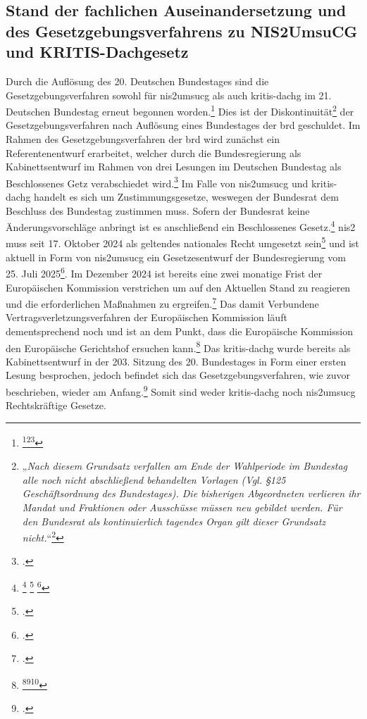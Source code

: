 \documentclass[11pt,a4paper,hidelinks]{article}   %
\begin{document}
        \subsection{Stand der fachlichen Auseinandersetzung und des Gesetzgebungsverfahrens zu NIS2UmsuCG und KRITIS-Dachgesetz}\label{subsec:AktuellerForschungsstand}
        Durch die Auflösung des 20. Deutschen Bundestages sind die Gesetzgebungsverfahren sowohl für \gls{nis2umsucg} als auch \gls{kritis-dachg} im 21. Deutschen Bundestag erneut begonnen worden.\footnote{\footcite[Vgl.][, Vgl.]{BTGO}\footcite[Vgl.][, S. 1]{brd:c54cf9}\footcite[Vgl.][, S. 52]{brd:4a7cbe}} Dies ist der Diskontinuität\footnote{„\emph{Nach diesem Grundsatz verfallen am Ende der Wahlperiode im Bundestag alle noch nicht abschließend behandelten Vorlagen (Vgl. §125 Geschäftsordnung des Bundestages). Die bisherigen Abgeordneten verlieren ihr Mandat und Fraktionen oder Ausschüsse müssen neu gebildet werden. Für den Bundesrat als kontinuierlich tagendes Organ gilt dieser Grundsatz nicht.}“\footcite[Vgl.][, S. 1]{brd:33503f}} der Gesetzgebungsverfahren nach Auflösung eines Bundestages der \gls{brd} geschuldet. Im Rahmen des Gesetzgebungsverfahren der \gls{brd} wird zunächst ein Referentenentwurf erarbeitet, welcher durch die Bundesregierung als Kabinettsentwurf im Rahmen von drei Lesungen im Deutschen Bundestag als Beschlossenes Getz verabschiedet wird.\footcite[Vgl.][, S. 1]{bmi:a4771a} Im Falle von \gls{nis2umsucg} und \gls{kritis-dachg} handelt es sich um Zustimmungsgesetze, weswegen der Bundesrat dem Beschluss des Bundestag zustimmen muss. Sofern der Bundesrat keine Änderungsvorschläge anbringt ist es anschließend ein Beschlossenes Gesetz.\footnote{
            \footcite[Vgl.][, Artikel 104a, Absatz 4]{GG}
            \footcite[Vgl.][, Artikel 84, Absatz 1 GG]{GG}
            \footcite[Vgl.][, S. 1]{bmi:a4771a}
        }\medbreak
        \gls{nis2} muss seit 17. Oktober 2024 als geltendes nationales Recht umgesetzt sein\footcite[Vgl.][, Artikel 21, Absatz 5]{EU2022-2555} und ist aktuell in Form von \gls{nis2umsucg} ein Gesetzesentwurf der Bundesregierung vom 25. Juli 2025\footcite[Vgl.][, S. 2]{bmi:98905b}. Im Dezember 2024 ist bereits eine zwei monatige Frist der Europäischen Kommission verstrichen um auf den Aktuellen Stand zu reagieren und die erforderlichen Maßnahmen zu ergreifen.\footcite[Vgl.][, S. 15]{eu:9274cb} Das damit Verbundene Vertragsverletzungsverfahren der Europäischen Kommission läuft dementsprechend noch und ist an dem Punkt, dass die Europäische Kommission den Europäische Gerichtshof ersuchen kann.\footnote{\footcite[Vgl.][, S. 2]{eu:4a7cbe}\footcite[Vgl.][, S. 2]{eu:376b82}\footcite[Vgl.][, S. 15]{eu:9274cb}} Das \gls{kritis-dachg} wurde bereits als Kabinettsentwurf in der 203. Sitzung des 20. Bundestages in Form einer ersten Lesung besprochen, jedoch befindet sich das Gesetzgebungsverfahren, wie zuvor beschrieben, wieder am Anfang.\footcite[Vgl.][, S. 26270 - 26280]{brd:8c35b7} Somit sind weder \gls{kritis-dachg} noch \gls{nis2umsucg} Rechtskräftige Gesetze.\medbreak
\end{document}
